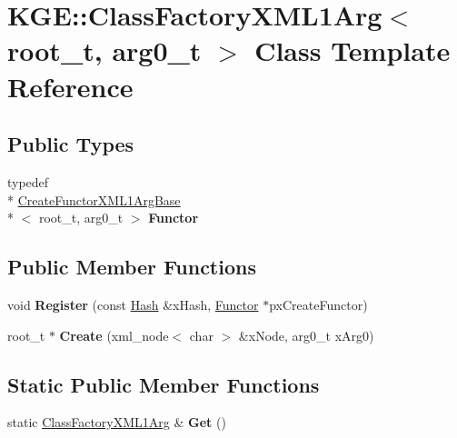 \hypertarget{class_k_g_e_1_1_class_factory_x_m_l1_arg}{\section{K\-G\-E\-:\-:Class\-Factory\-X\-M\-L1\-Arg$<$ root\-\_\-t, arg0\-\_\-t $>$ Class Template Reference}
\label{class_k_g_e_1_1_class_factory_x_m_l1_arg}
}
\subsection*{Public Types}
\begin{DoxyCompactItemize}
\item 
\hypertarget{class_k_g_e_1_1_class_factory_x_m_l1_arg_aebbdbabc79044d6cc51e180944a7a723}{typedef \\*
\hyperlink{class_k_g_e_1_1_create_functor_x_m_l1_arg_base}{Create\-Functor\-X\-M\-L1\-Arg\-Base}\\*
$<$ root\-\_\-t, arg0\-\_\-t $>$ {\bfseries Functor}}\label{class_k_g_e_1_1_class_factory_x_m_l1_arg_aebbdbabc79044d6cc51e180944a7a723}

\end{DoxyCompactItemize}
\subsection*{Public Member Functions}
\begin{DoxyCompactItemize}
\item 
\hypertarget{class_k_g_e_1_1_class_factory_x_m_l1_arg_a8c3d004e79ea696f4166c0cd66e5c3ca}{void {\bfseries Register} (const \hyperlink{class_k_g_e_1_1_hash}{Hash} \&x\-Hash, \hyperlink{class_k_g_e_1_1_create_functor_x_m_l1_arg_base}{Functor} $\ast$px\-Create\-Functor)}\label{class_k_g_e_1_1_class_factory_x_m_l1_arg_a8c3d004e79ea696f4166c0cd66e5c3ca}

\item 
\hypertarget{class_k_g_e_1_1_class_factory_x_m_l1_arg_aa2be3450995ec528547b3eb1eb579a13}{root\-\_\-t $\ast$ {\bfseries Create} (xml\-\_\-node$<$ char $>$ \&x\-Node, arg0\-\_\-t x\-Arg0)}\label{class_k_g_e_1_1_class_factory_x_m_l1_arg_aa2be3450995ec528547b3eb1eb579a13}

\end{DoxyCompactItemize}
\subsection*{Static Public Member Functions}
\begin{DoxyCompactItemize}
\item 
\hypertarget{class_k_g_e_1_1_class_factory_x_m_l1_arg_ae2f04e58952b885d516fe7033b916866}{static \hyperlink{class_k_g_e_1_1_class_factory_x_m_l1_arg}{Class\-Factory\-X\-M\-L1\-Arg} \& {\bfseries Get} ()}\label{class_k_g_e_1_1_class_factory_x_m_l1_arg_ae2f04e58952b885d516fe7033b916866}

\end{DoxyCompactItemize}

